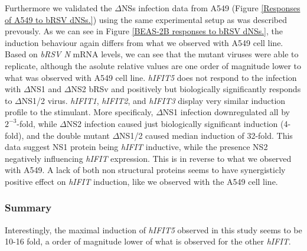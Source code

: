 Furthermore we validated the \(\Delta\)NSs infection data from A549 (Figure \ref{Responses of A549 to bRSV dNSs.}) using the same experimental setup as was described prevously. As we can see in Figure \ref{BEAS-2B responses to bRSV dNSs.}, the induction behaviour again differs from what we observed with A549 cell line. Based on \textit{bRSV N} mRNA levels, we can see that the mutant viruses were able to replicate, although the asolute relative values are one order of magnitude lower to what was observed with A549 cell line. \textit{hIFIT5} does not respond to the infection with \(\Delta\)NS1 and \(\Delta\)NS2 bRSv and positively but biologically significantly responds to \(\Delta\)NS1/2 virus. \textit{hIFIT1}, \textit{hIFIT2}, and \textit{hIFIT3} display very similar induction profile to the stimulant. More specificaly, \(\Delta\)NS1 infection downregulated all by \(2^{-3}\)-fold, while \(\Delta\)NS2 infection caused just biologically significant induction (4-fold), and the double mutant \(\Delta\)NS1/2 caused median induction of 32-fold. This data suggest NS1 protein being \textit{hIFIT} inductive, while the presence NS2 negatively influencing \textit{hIFIT} expression. This is in reverse to what we observed with A549. A lack of both non structural proteins seems to have synergisticly positive effect on \textit{hIFIT} induction, like we observed with the A549 cell line.

\subsubsection*{Summary} \label{Summary-human-induction}
Interestingly, the maximal induction of \textit{hIFIT5} observed in this study seems to be 10-16 fold, a order of magnitude lower of what is observed for the other \textit{hIFIT}.